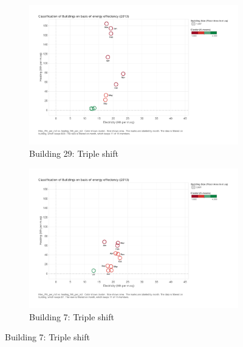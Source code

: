\begin{figure}[H]
        \centering
        \begin{subfigure}[b]{0.45\textwidth}
                \includegraphics[width=\textwidth]{images/kmeans_b29_3c.pdf}
                \caption{Building 29:  Triple shift}
                \label{fig:tri_1}
        \end{subfigure}%
        \begin{subfigure}[b]{0.45\textwidth}
                \includegraphics[width=\textwidth]{images/kmeans_b7.pdf}
                \caption{Building 7: Triple shift}
                \label{fig:tri_2}
        \end{subfigure}
        

\end{figure}
